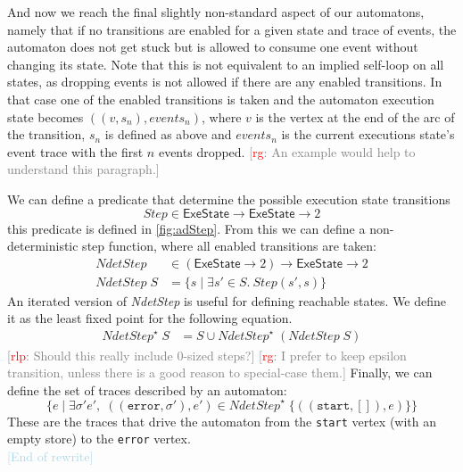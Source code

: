 \documentclass[preprint]{sigplanconf} %
\newcommand{\note}[2]{\textcolor{gray}{[\textcolor{red}{#1}: #2]}}
\newcommand{\rg}[1]{\note{rg}{#1}}
\newcommand{\rlp}[1]{\note{rlp}{#1}}
\newcommand{\set}[1]{\ensuremath{\mathsf{#1}}}
\theoremstyle{definition}
\theoremstyle{remark}
\begin{document}
And now we reach the final slightly non-standard aspect of our
automatons, namely that if no transitions are enabled for a given
state and trace of events, the automaton does not get stuck but is
allowed to consume one event without changing its state. Note that
this is not equivalent to an implied self-loop on all states, as
dropping events is not allowed if there are any enabled
transitions. In that case one of the enabled transitions is taken and
the automaton execution state becomes $((v, s_n), \mathit{events}_n)$, where $v$ is the vertex at the
end of the arc of the transition, $s_n$ is defined as above and
$\mathit{events}_n$ is the current executions state's event trace with the first
$n$ events dropped.
\rg{An example would help to understand this paragraph.}

We can define a predicate that determine the possible execution state transitions
\[
\mathit{Step}\in\set{ExeState}\to\set{ExeState}\to2
\]
this predicate is defined in \autoref{fig:adStep}.
From this we can define a non-deterministic step function, where all
enabled transitions are taken:
\begin{align}
\mathit{NdetStep}&\in(\set{ExeState}\to2)\to\set{ExeState}\to2\\
\mathit{NdetStep}\;S&=\{ s \mid \exists s'\in S.\ \mathit{Step}(s', s) \} \label{eq:ndetstep}
\end{align}
An iterated version of \textit{NdetStep} is useful for defining reachable states.
We define it as the least fixed point for the following equation.
\begin{align}
\mathit{NdetStep}^\star\;S &= S \cup \mathit{NdetStep}^\star\;(\mathit{NdetStep}\;S)
\end{align}
\rlp{Should this really include 0-sized steps?}
\rg{I prefer to keep epsilon transition, unless there is a good reason to special-case them.}
Finally, we can define the set of traces described by an automaton:
\[
\{ e \mid
\exists\sigma'e',\;((\mathtt{error},\sigma'),e')\in\mathit{NdetStep}^\star\;\{((\mathtt{start},[]),e)\}
\}
\]
These are the traces that drive the automaton from the \texttt{start} vertex (with an empty store) to the \texttt{error} vertex.
\ \\ \textcolor{lightblue}{[End of rewrite]}\\
\end{document}
